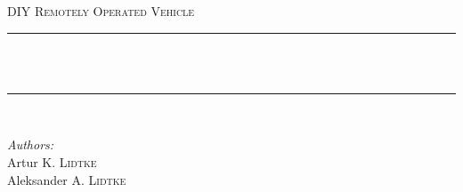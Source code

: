 \begin{titlepage}

\newcommand{\HRule}{\rule{\linewidth}{0.5mm}} %

\center %



\vspace*{1cm}
{ %

\vspace{2.5cm}
\textsc{\huge DIY Remotely Operated Vehicle}\\[4.5cm] %

}

\HRule \\[0.4cm]
{ \Huge \bfseries \documenttitle}\\[0.2cm] %
\HRule \\[4.5cm]
 

\begin{center}
\Large
\emph{Authors:}\\
Artur K. \textsc{Lidtke} \\
Aleksander A. \textsc{Lidtke}
\end{center}


\end{titlepage}
